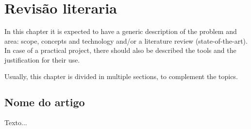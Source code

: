 \chapter{Revisão literaria }\label{cap:conceptual}

In this chapter it is expected to have a generic description of the problem and area: scope, concepts and technology and/or a literature review (state-of-the-art). In case of a practical project, there should also be described the tools and the justification for their use.

Usually, this chapter is divided in multiple sections, to complement the topics.

\section[Nome do artigo]{Nome do artigo}

Texto...